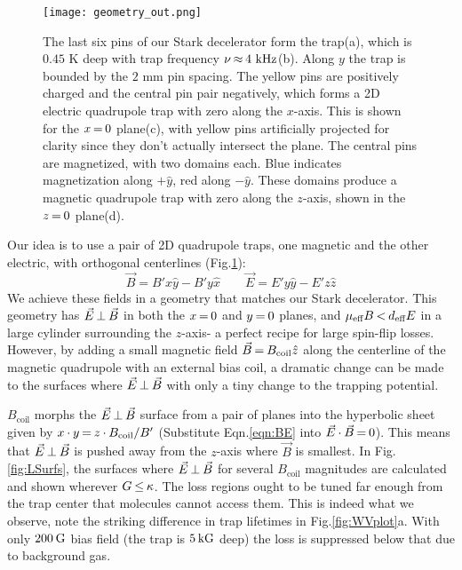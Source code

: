 \documentclass[%
 reprint,
 amsmath,amssymb,
 aps,
prl,
]{revtex4-1}
\newcommand{\bcl}{{$B_\text{coil}$}}
\newcommand{\epb}{{$\vec{E}\s {\perp}\s\vec{B}$}}
\newcommand{\s}{{\nobreak\hspace{.2em}}}
\begin{document}



\begin{figure}[tb]
\texttt{[image: geometry\_out.png]}%
\caption{
The last six pins of our Stark decelerator\s\cite{Sawyer2008} form the trap\s(a), which is $0.45\text{ K}$ deep with trap frequency $\nu\s {\approx}\s 4\text{ kHz}$\s(b). 
Along $y$ the trap is bounded by the $2\text{ mm}$ pin spacing. 
The yellow pins are positively charged and the central pin pair negatively, which forms a 2D electric quadrupole trap with zero along the $x$-axis. 
This is shown for the $x\s {=}\s 0$ plane\s(c), with yellow pins artificially projected for clarity since they don't actually intersect the plane. 
The central pins are magnetized, with two domains each. 
Blue indicates magnetization along $+\hat{y}$, red along $-\hat{y}$. 
These domains produce a magnetic quadrupole trap with zero along the $z$-axis, shown in the $z\s {=}\s 0$ plane\s(d). 
\label{fig:CAD}}
\end{figure}

Our idea is to use a pair of 2D quadrupole traps, one magnetic and the other electric, with orthogonal centerlines (Fig.\s\ref{fig:CAD}):
\begin{equation}
\label{eqn:BE}
\vec{B}=B'x\hat{y}-B'y\hat{x}\quad\quad\vec{E}=E'y\hat{y}-E'z\hat{z}
\end{equation}
We achieve these fields in a geometry that matches our Stark decelerator\s\cite{Bochinski2003}. 
This geometry has \epb{} in both the $x\s {=}\s 0$ and $y\s {=}\s 0$ planes, and $\mu_\text{eff}B \s {<}\s  d_\text{eff}E$ in a large cylinder surrounding the $z$-axis- a perfect recipe for large spin-flip losses.
However, by adding a small magnetic field $\vec{B}\s {=}\s B_\text{coil}\hat{z}$ along the centerline of the magnetic quadrupole with an external bias coil, a dramatic change can be made to the surfaces where \epb{} with only a tiny change to the trapping potential.

\bcl{} morphs the \epb{} surface from a pair of planes into the hyperbolic sheet given by
$x\s {\cdot}\s y\s {=}\s  z\s {\cdot}\s B_\text{coil}/B'$
(Substitute Eqn.\s\ref{eqn:BE} into  $\vec{E}\s {\cdot}\s\vec{B}\s {=}\s 0$).
This means that \epb{} is pushed away from the $z$-axis where $\vec{B}$ is smallest.
In Fig.\s\ref{fig:LSurfs}, the surfaces where \epb{} for several \bcl{} magnitudes are calculated and shown wherever $G\s {\le}\s\kappa$.
The loss regions ought to be tuned far enough from the trap center that molecules cannot access them.
This is indeed what we observe, note the striking difference in trap lifetimes in Fig.\s\ref{fig:WVplot}a.
With only $200\s\text{G}$ bias field (the trap is $5\s\text{kG}$ deep) the loss is suppressed below that due to background gas.
\end{document}
